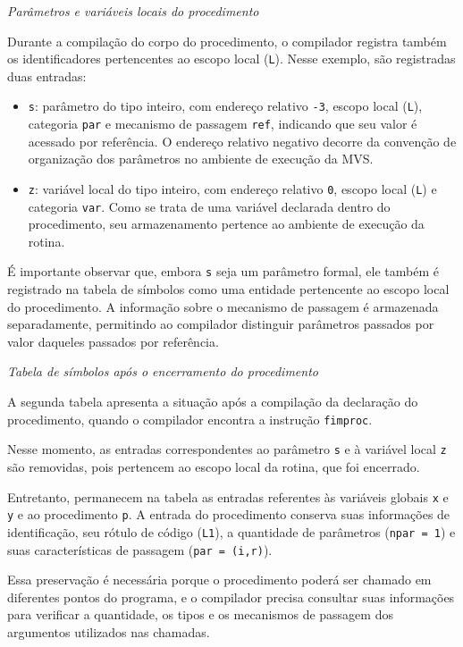 \documentclass[
  brazilian,
  letterpaper,
]{book}
\providecommand{\tightlist}{%
  \setlength{\itemsep}{0pt}\setlength{\parskip}{0pt}}
\theoremstyle{plain}
\theoremstyle{definition}
\theoremstyle{remark}
\begin{document}
\emph{Parâmetros e variáveis locais do procedimento}

Durante a compilação do corpo do procedimento, o compilador registra
também os identificadores pertencentes ao escopo local (\texttt{L}).
Nesse exemplo, são registradas duas entradas:

\begin{itemize}
\tightlist
\item
  \texttt{s}: parâmetro do tipo inteiro, com endereço relativo
  \texttt{-3}, escopo local (\texttt{L}), categoria \texttt{par} e
  mecanismo de passagem \texttt{ref}, indicando que seu valor é acessado
  por referência. O endereço relativo negativo decorre da convenção de
  organização dos parâmetros no ambiente de execução da MVS.
\item
  \texttt{z}: variável local do tipo inteiro, com endereço relativo
  \texttt{0}, escopo local (\texttt{L}) e categoria \texttt{var}. Como
  se trata de uma variável declarada dentro do procedimento, seu
  armazenamento pertence ao ambiente de execução da rotina.
\end{itemize}

É importante observar que, embora \texttt{s} seja um parâmetro formal,
ele também é registrado na tabela de símbolos como uma entidade
pertencente ao escopo local do procedimento. A informação sobre o
mecanismo de passagem é armazenada separadamente, permitindo ao
compilador distinguir parâmetros passados por valor daqueles passados
por referência.

\emph{Tabela de símbolos após o encerramento do procedimento}

A segunda tabela apresenta a situação após a compilação da declaração do
procedimento, quando o compilador encontra a instrução \texttt{fimproc}.

Nesse momento, as entradas correspondentes ao parâmetro \texttt{s} e à
variável local \texttt{z} são removidas, pois pertencem ao escopo local
da rotina, que foi encerrado.

Entretanto, permanecem na tabela as entradas referentes às variáveis
globais \texttt{x} e \texttt{y} e ao procedimento \texttt{p}. A entrada
do procedimento conserva suas informações de identificação, seu rótulo
de código (\texttt{L1}), a quantidade de parâmetros
(\texttt{npar\ =\ 1}) e suas características de passagem
(\texttt{par\ =\ (i,r)}).

Essa preservação é necessária porque o procedimento poderá ser chamado
em diferentes pontos do programa, e o compilador precisa consultar suas
informações para verificar a quantidade, os tipos e os mecanismos de
passagem dos argumentos utilizados nas chamadas.
\end{document}
